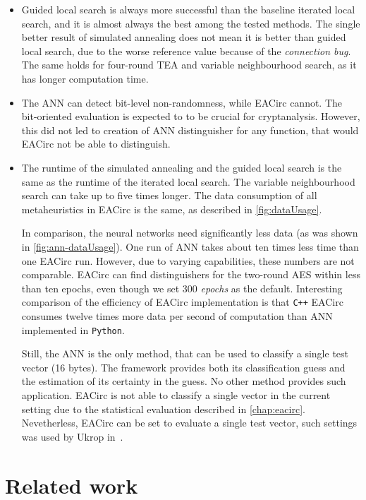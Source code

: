 \documentclass[
  print, %
  Table,   %
  nolof,     %
  nolot,     %
  11pt, %
  oneside  %
]{fithesis3}
\begin{document}
\begin{itemize}
    \item Guided local search is always more successful than the baseline iterated local search, and it is almost always the best among the tested methods. The single better result of simulated annealing does not mean it is better than guided local search, due to the worse reference value because of the \textit{connection bug}. The same holds for four-round TEA and variable neighbourhood search, as it has longer computation time.
    \item The ANN can detect bit-level non-randomness, while EACirc cannot. The bit-oriented evaluation is expected to to be crucial for cryptanalysis. However, this did not led to creation of ANN distinguisher for any function, that would EACirc not be able to distinguish.
    \item The runtime of the simulated annealing and the guided local search is the same as the runtime of the iterated local search. The variable neighbourhood search can take up to five times longer. The data consumption of all metaheuristics in EACirc is the same, as described in \cref{fig:dataUsage}.
    
    In comparison, the neural networks need significantly less data (as was shown in \cref{fig:ann-dataUsage}). One run of ANN takes about ten times less time than one EACirc run. However, due to varying capabilities, these numbers are not comparable. EACirc can find distinguishers for the two-round AES within less than ten epochs, even though we set 300 \textit{epochs} as the default. Interesting comparison of the efficiency of EACirc implementation is that \texttt{C++} EACirc consumes twelve times more data per second of computation than ANN implemented in \texttt{Python}.
    
    Still, the ANN is the only method, that can be used to classify a single test vector (16 bytes). The framework provides both its classification guess and the estimation of its certainty in the guess. No other method provides such application. EACirc is not able to classify a single vector in the current setting due to the statistical evaluation described in \cref{chap:eacirc}. Nevetherless, EACirc can be set to evaluate a single test vector, such settings was used by Ukrop in~\cite{ukropBcThesis}.
\end{itemize}

\chapter{Related work}
\label{chap:relatwork}
\end{document}
